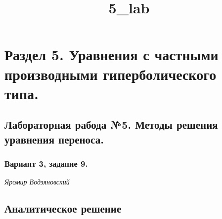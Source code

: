 \documentclass[11pt]{article}
\title{5\_lab}
\begin{document}
    
    \maketitle
    
    

    
    \hypertarget{ux440ux430ux437ux434ux435ux43b-5.-ux443ux440ux430ux432ux43dux435ux43dux438ux44f-ux441-ux447ux430ux441ux442ux43dux44bux43cux438-ux43fux440ux43eux438ux437ux432ux43eux434ux43dux44bux43cux438-ux433ux438ux43fux435ux440ux431ux43eux43bux438ux447ux435ux441ux43aux43eux433ux43e-ux442ux438ux43fux430.}{%
\section{Раздел 5. Уравнения с частными производными гиперболического
типа.}\label{ux440ux430ux437ux434ux435ux43b-5.-ux443ux440ux430ux432ux43dux435ux43dux438ux44f-ux441-ux447ux430ux441ux442ux43dux44bux43cux438-ux43fux440ux43eux438ux437ux432ux43eux434ux43dux44bux43cux438-ux433ux438ux43fux435ux440ux431ux43eux43bux438ux447ux435ux441ux43aux43eux433ux43e-ux442ux438ux43fux430.}}

\hypertarget{ux43bux430ux431ux43eux440ux430ux442ux43eux440ux43dux430ux44f-ux440ux430ux431ux43eux434ux430-5.-ux43cux435ux442ux43eux434ux44b-ux440ux435ux448ux435ux43dux438ux44f-ux443ux440ux430ux432ux43dux435ux43dux438ux44f-ux43fux435ux440ux435ux43dux43eux441ux430.}{%
\subsection{Лабораторная рабода №5. Методы решения уравнения
переноса.}\label{ux43bux430ux431ux43eux440ux430ux442ux43eux440ux43dux430ux44f-ux440ux430ux431ux43eux434ux430-5.-ux43cux435ux442ux43eux434ux44b-ux440ux435ux448ux435ux43dux438ux44f-ux443ux440ux430ux432ux43dux435ux43dux438ux44f-ux43fux435ux440ux435ux43dux43eux441ux430.}}

\hypertarget{ux432ux430ux440ux438ux430ux43dux442-3-ux437ux430ux434ux430ux43dux438ux435-9.}{%
\subsubsection{Вариант 3, задание
9.}\label{ux432ux430ux440ux438ux430ux43dux442-3-ux437ux430ux434ux430ux43dux438ux435-9.}}

\emph{Яромир Водзяновский}

    \hypertarget{ux430ux43dux430ux43bux438ux442ux438ux447ux435ux441ux43aux43eux435-ux440ux435ux448ux435ux43dux438ux435}{%
\subsection{Аналитическое
решение}\label{ux430ux43dux430ux43bux438ux442ux438ux447ux435ux441ux43aux43eux435-ux440ux435ux448ux435ux43dux438ux435}}
\end{document}
